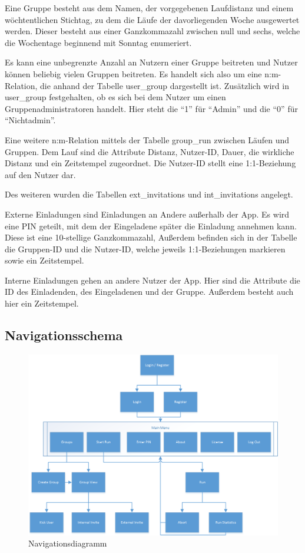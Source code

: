 Eine Gruppe besteht aus dem Namen, der vorgegebenen Laufdistanz und einem wöchtentlichen Stichtag, zu dem die Läufe der davorliegenden Woche ausgewertet werden. Dieser besteht aus einer Ganzkommazahl zwischen null und sechs, welche die Wochentage beginnend mit Sonntag enumeriert.

Es kann eine unbegrenzte Anzahl an Nutzern einer Gruppe beitreten und Nutzer können beliebig vielen Gruppen beitreten. Es handelt sich also um eine n:m-Relation, die anhand der Tabelle user\_group dargestellt ist. Zusätzlich wird in user\_group festgehalten, ob es sich bei dem Nutzer um einen Gruppenadministratoren handelt. Hier steht die ``1'' für ``Admin'' und die ``0'' für ``Nichtadmin''.

Eine weitere n:m-Relation mittels der Tabelle group\_run zwischen Läufen und Gruppen. Dem Lauf sind die Attribute Distanz, Nutzer-ID, Dauer, die wirkliche Distanz und ein Zeitstempel zugeordnet. Die Nutzer-ID stellt eine 1:1-Beziehung auf den Nutzer dar.

Des weiteren wurden die Tabellen ext\_invitations und int\_invitations angelegt.

Externe Einladungen sind Einladungen an Andere außerhalb der App. Es wird eine PIN geteilt, mit dem der Eingeladene später die Einladung annehmen kann. Diese ist eine 10-stellige Ganzkommazahl, Außerdem befinden sich in der Tabelle die Gruppen-ID und die Nutzer-ID, welche jeweils 1:1-Beziehungen markieren sowie ein Zeitstempel.

Interne Einladungen gehen an andere Nutzer der App. Hier sind die Attribute die ID des Einladenden, des Eingeladenen und der Gruppe. Außerdem besteht auch hier ein Zeitstempel.
\subsection{Navigationsschema}
\begin{figure}[htb]
\centering
\includegraphics[width=\textwidth]{abb/navigation_diagram}
\caption{Navigationsdiagramm}
\end{figure}

